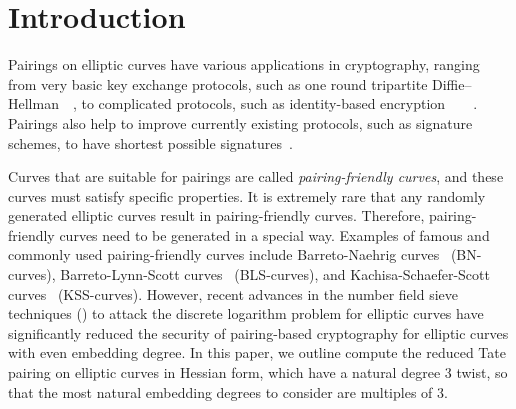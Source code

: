 %
%
%
%
%
%
%
%
%
%

\section{Introduction}

Pairings on elliptic curves have various applications in cryptography,
ranging from very basic key exchange protocols,
such as one round tripartite Diffie--Hellman~\cite{2000/joux-ants}~\cite{2004/joux-tripartite},
to complicated protocols, such as
identity-based encryption~\cite{2001/boneh}~\cite{2002/horwitz}~\cite{2002/gentry}~\cite{2005/sahai}.
Pairings also help to improve currently existing protocols, 
such as signature schemes, to have shortest possible signatures~\cite{2004/boneh}.

Curves that are suitable for pairings are called {\emph{pairing-friendly curves}},
and these curves must satisfy specific properties.
It is extremely rare that any randomly generated elliptic curves result in pairing-friendly curves.
Therefore, pairing-friendly curves need to be generated in a special way.
Examples of famous and commonly used pairing-friendly curves include 
Barreto-Naehrig curves~\cite{2006/barreto} (BN-curves),
Barreto-Lynn-Scott curves~\cite{2003/bls} (BLS-curves), and
Kachisa-Schaefer-Scott curves~\cite{2008/kss} (KSS-curves). However, recent advances in the number field sieve techniques (\cite{?}) to attack the discrete logarithm problem for elliptic curves have significantly reduced the security of pairing-based cryptography for elliptic curves with even embedding degree. In this paper, we outline compute the reduced Tate pairing on elliptic curves in Hessian form, which have a natural degree 3 twist, so that the most natural embedding degrees to consider are multiples of 3.

